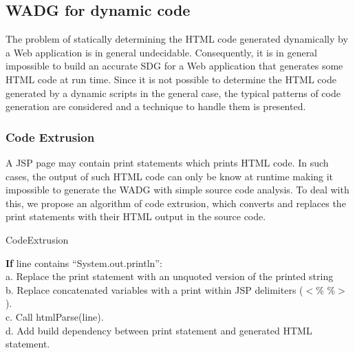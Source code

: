 \documentclass[11pt]{article}   %
\begin{document}
\subsection{WADG for dynamic code}
The problem of statically determining the HTML code generated dynamically by a Web application is in general undecidable. Consequently, it is in general impossible to build an accurate SDG for a Web application that generates some HTML code at run time.
Since it is not possible to determine the HTML code generated by a dynamic scripts in the general case, the typical patterns of code generation are considered and a technique to handle them is presented.

\subsubsection{Code Extrusion}
A JSP page may contain print statements which prints HTML code. In such cases, the output of such HTML code can only be know at runtime making it impossible to generate the WADG  with simple source code analysis.
To deal with this, we propose an algorithm of code extrusion, which converts and replaces the print statements with their HTML output in the source code.

\begin{algorithm}
\caption{CodeExtrusion}
\begin{algorithmic}[1]
\State \textbf{If} line contains “System.out.println”:\\
\hspace{2cm}a. Replace the print statement with an unquoted version of the printed string\\
\hspace{2cm}b. Replace concatenated variables with a print within JSP delimiters ($<$\% \%$>$). \\
\hspace{2cm}c. Call htmlParse(line).\\
\hspace{2cm}d. Add build dependency between print statement and generated HTML statement.
\end{algorithmic}
\end{algorithm}
\end{document}
